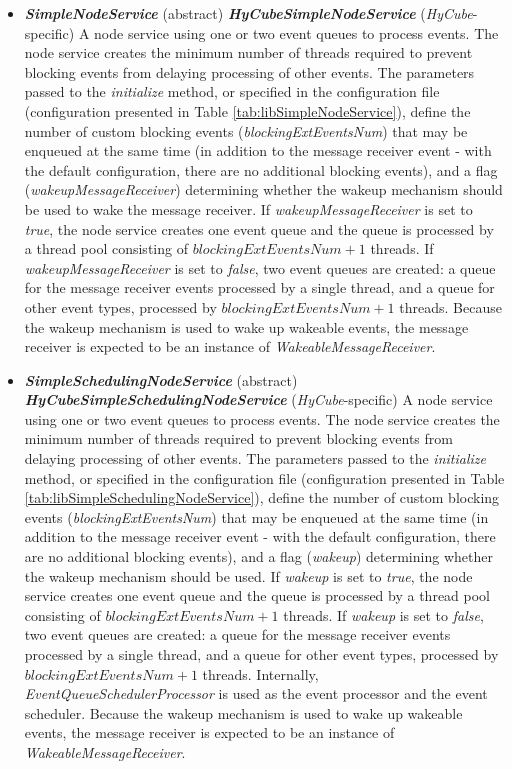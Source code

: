\begin{itemize}
	\item \textbf{\emph{SimpleNodeService}} (abstract) \newline \textbf{\emph{HyCubeSimpleNodeService}} (\emph{HyCube}-specific) \newline A node service using one or two event queues to process events. The node service creates the minimum number of threads required to prevent blocking events from delaying processing of other events. The parameters passed to the \emph{initialize} method, or specified in the configuration file (configuration presented in Table \ref{tab:libSimpleNodeService}), define the number of custom blocking events (\emph{blockingExtEventsNum}) that may be enqueued at the same time (in addition to the message receiver event - with the default configuration, there are no additional blocking events), and a flag (\emph{wakeupMessageReceiver}) determining whether the wakeup mechanism should be used to wake the message receiver. If \emph{wakeupMessageReceiver} is set to \emph{true}, the node service creates one event queue and the queue is processed by a thread pool consisting of $blockingExtEventsNum+1$ threads. If \emph{wakeupMessageReceiver} is set to \emph{false}, two event queues are created: a queue for the message receiver events processed by a single thread, and a queue for other event types, processed by $blockingExtEventsNum+1$ threads. Because the wakeup mechanism is used to wake up wakeable events, the message receiver is expected to be an instance of \emph{WakeableMessageReceiver}.
	
	\item \textbf{\emph{SimpleSchedulingNodeService}} (abstract) \newline \textbf{\emph{HyCubeSimpleSchedulingNodeService}} (\emph{HyCube}-specific) \newline A node service using one or two event queues to process events. The node service creates the minimum number of threads required to prevent blocking events from delaying processing of other events. The parameters passed to the \emph{initialize} method, or specified in the configuration file (configuration presented in Table \ref{tab:libSimpleSchedulingNodeService}), define the number of custom blocking events (\emph{blockingExtEventsNum}) that may be enqueued at the same time (in addition to the message receiver event - with the default configuration, there are no additional blocking events), and a flag (\emph{wakeup}) determining whether the wakeup mechanism should be used. If \emph{wakeup} is set to \emph{true}, the node service creates one event queue and the queue is processed by a thread pool consisting of $blockingExtEventsNum+1$ threads. If \emph{wakeup} is set to \emph{false}, two event queues are created: a queue for the message receiver events processed by a single thread, and a queue for other event types, processed by $blockingExtEventsNum+1$ threads.  Internally, \emph{EventQueueSchedulerProcessor} is used as the event processor and the event scheduler. Because the wakeup mechanism is used to wake up wakeable events, the message receiver is expected to be an instance of \emph{WakeableMessageReceiver}.
	
\end{itemize}


